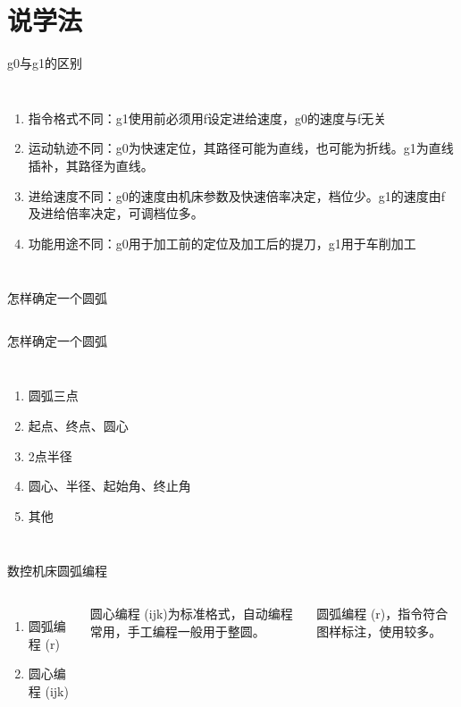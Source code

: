 \documentclass[utf8,zihao=-4]{ctexbeamer}
\begin{document}
\section{说学法}
\begin{frame}{g0与g1的区别}
    \begin{columns}[onlytextwidth]
        \column{\textwidth}
\begin{enumerate}
    \item 指令格式不同：g1使用前必须用f设定进给速度，g0的速度与f无关 
    \item 运动轨迹不同：g0为快速定位，其路径可能为直线，也可能为折线。g1为直线插补，其路径为直线。
    \item 进给速度不同：g0的速度由机床参数及快速倍率决定，档位少。g1的速度由f及进给倍率决定，可调档位多。
    \item 功能用途不同：g0用于加工前的定位及加工后的提刀，g1用于车削加工
\end{enumerate}
    \end{columns}
\end{frame}


\begin{frame}{怎样确定一个圆弧}
    \begin{columns}
        \column{\textwidth}
    \end{columns}
\end{frame}

\begin{frame}{怎样确定一个圆弧}
    \begin{columns}
        \column{\textwidth}
        \begin{enumerate}
            \item 圆弧三点
            \item 起点、终点、圆心
            \item 2点半径
            \item 圆心、半径、起始角、终止角
            \item 其他
        \end{enumerate}
    \end{columns}
\end{frame}

\begin{frame}{数控机床圆弧编程}
    \begin{columns}
        \begin{enumerate}
            \item 圆弧编程 (r)
            \item 圆心编程 (ijk)
        \end{enumerate}
         \vspace{1cm}
         圆心编程 (ijk)为标准格式，自动编程常用，手工编程一般用于整圆。
         
         圆弧编程 (r)，指令符合图样标注，使用较多。
    \end{columns}
\end{frame}
\end{document}
